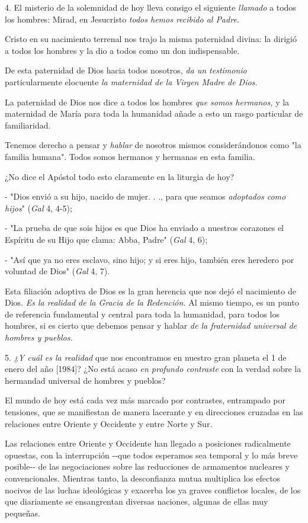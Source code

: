 \begin{body}
4. El misterio de la solemnidad de hoy lleva consigo el siguiente \emph{llamado} a todos los hombres: Mirad, en Jesucristo \emph{todos 	hemos recibido al Padre.}

Cristo en su nacimiento terrenal nos trajo la misma paternidad divina: la dirigió a todos los hombres y la dio a todos como un don indispensable.

De esta paternidad de Dios hacia todos nosotros, \emph{da un testimonio} particularmente elocuente \emph{la maternidad de la Virgen Madre de 	Dios.}

La paternidad de Dios nos dice a todos los hombres \emph{que somos 	hermanos,} y la maternidad de María para toda la humanidad añade a esto un rasgo particular de familiaridad.

Tenemos derecho a pensar y \emph{hablar} de nosotros mismos considerándonos como "la familia humana". Todos somos hermanos y hermanas en esta familia.

¿No dice el Apóstol todo esto claramente en la liturgia de hoy?

- "Dios envió a su hijo, nacido de mujer. . ., para que seamos \emph{adoptados como hijos}" (\emph{Gal} 4, 4-5);

- "La prueba de que sois hijos es que Dios ha enviado a nuestros corazones el Espíritu de su Hijo que clama: Abba, Padre" (\emph{Gal} 4, 6);

- "Así que ya no eres esclavo, sino hijo; y si eres hijo, también eres heredero por voluntad de Dios" (\emph{Gal} 4, 7).

Esta filiación adoptiva de Dios es la gran herencia que nos dejó el nacimiento de Dios. \emph{Es la realidad de la Gracia de la Redención.} Al mismo tiempo, es un punto de referencia fundamental y central para toda la humanidad, para todos los hombres, si es cierto que debemos pensar y hablar \emph{de la fraternidad universal de hombres y pueblos.}

5. \emph{¿Y cuál es la realidad} que nos encontramos en nuestro gran planeta el 1 de enero del año {[}1984{]}? ¿No está acaso \emph{en 	profundo contraste} con la verdad sobre la hermandad universal de hombres y pueblos?

El mundo de hoy está cada vez más marcado por contrastes, entrampado por tensiones, que se manifiestan de manera lacerante y en direcciones cruzadas en las relaciones entre Oriente y Occidente y entre Norte y Sur.

Las relaciones entre Oriente y Occidente han llegado a posiciones radicalmente opuestas, con la interrupción -\/-que todos esperamos sea temporal y lo más breve posible-\/- de las negociaciones sobre las reducciones de armamentos nucleares y convencionales. Mientras tanto, la desconfianza mutua multiplica los efectos nocivos de las luchas ideológicas y exacerba los ya graves conflictos locales, de los que diariamente se ensangrentan diversas naciones, algunas de ellas muy pequeñas.


\end{body}
